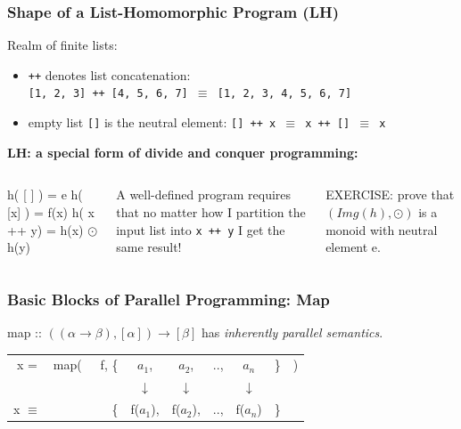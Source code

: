 \documentclass{beamer}
\renewcommand{\emph}[1]{\textcolor{structure}{#1}}
\newcommand{\emp}[1]{\textcolor{DikuRed}{ #1}}
\newcommand{\mymath}[1]{$ #1 $}
\begin{document}
\begin{frame}[fragile,t]
\frametitle{Shape of a List-Homomorphic Program (LH)}

Realm of finite lists:
\begin{itemize}
    \item {\tt ++} denotes list concatenation:\\
    {\tt [1, 2, 3] ++ [4, 5, 6, 7] $\equiv$ [1, 2, 3, 4, 5, 6, 7]}
    \item empty list {\tt []} is the neutral element:
        {\tt [] ++ x $\equiv$ x ++ [] $\equiv$ x}
\end{itemize}
\bigskip

\emp{\bf LH: a special form of divide and conquer programming:}
\begin{columns}
\begin{colorcode}[fontsize=\small]
h( [ ] )   = e
h( [x] )   = f(x)
h( x ++ y) = h(x) \mymath{\odot} h(y)
\end{colorcode}
\emph{A well-defined program requires that no matter how 
I partition the input list into {\tt x ++ y} I get the same result!}
\begin{colorcode}[fontsize=\small]
\alert{EXERCISE:} prove that
\mymath{(Img(h),\odot)} is a monoid 
with neutral element e.
\end{colorcode}
\end{columns}

\end{frame}


\begin{frame}[fragile,t]
   \frametitle{Basic Blocks of Parallel Programming: Map}

\bigskip

\emp{map} :: $((\alpha \rightarrow \beta), [\alpha]) \rightarrow [\beta] $ has \emph{\em inherently parallel semantics}.


\bigskip

\begin{tabular}{crcccccl}
x = & \emp{map}(~~~f, \{& $a_1$, & $a_2$, & .., & $a_n$ & \} & )\\
    &      & $\downarrow$ & $\downarrow$ &  & $\downarrow$ & &\\
x $\equiv$ &  \{  & \emph{f($a_1$)}, & \emph{f($a_2$)}, & .., & \emph{f($a_n$)} & \} &
\end{tabular}

\end{frame}
\end{document}
